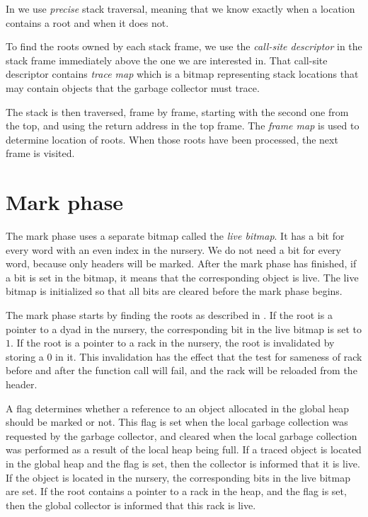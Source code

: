 In \sysname{} we use \emph{precise} stack traversal, meaning that we
know exactly when a location contains a root and when it does not.

To find the roots owned by each stack frame, we use the
\emph{call-site descriptor}  in the
stack frame immediately above the one we are interested in.  That
call-site descriptor contains \emph{trace map} which is a bitmap
representing stack locations that may contain objects that the garbage
collector must trace.

The stack is then traversed, frame by frame, starting with the second
one from the top, and using the return address in the top frame.
The \emph{frame map} is used to determine location of roots.
When those roots have been processed, the next frame is visited.

\section{Mark phase}

The mark phase uses a separate bitmap called the \emph{live bitmap}.
It has a bit for every word with an even index in the nursery.  We do
not need a bit for every word, because only headers will be marked.
After the mark phase has finished, if a bit is set in the bitmap, it
means that the corresponding object is live.  The live bitmap is
initialized so that all bits are cleared before the mark phase begins.

The mark phase starts by finding the roots as described in
.  If the root is a
pointer to a dyad in the nursery, the corresponding bit in the live
bitmap is set to $1$.  If the root is a pointer to a rack in the
nursery, the root is invalidated by storing a $0$ in it.  This
invalidation has the effect that the test for sameness of rack before
and after the function call will fail, and the rack will be reloaded
from the header.

A flag determines whether a reference to an object allocated in the
global heap should be marked or not.  This flag is set when the local
garbage collection was requested by the garbage collector, and
cleared when the local garbage collection was performed as a result of
the local heap being full.  If a traced object is located in the
global heap and the flag is set, then the collector is informed
that it is live.  If the object is located in the nursery, the
corresponding bits in the live bitmap are set.  If the root contains a
pointer to a rack in the heap, and the flag is set, then the
global collector is informed that this rack is live.

